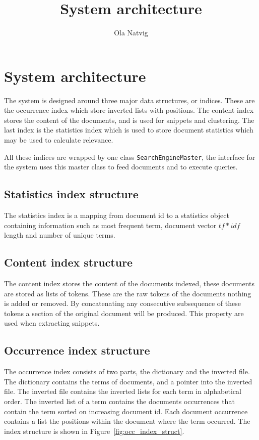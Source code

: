 \documentclass[]{article}
\title{System architecture}
\author{Ola Natvig}
\begin{document}
\maketitle
\section{System architecture}
The system is designed around three major data structures, or indices. These are the occurrence index which store inverted lists with positions. The content index stores the content of the documents, and is used for snippets and clustering. The last index is the statistics index which is used to store document statistics which may be used to calculate relevance. 

All these indices are wrapped by one class \texttt{SearchEngineMaster}, the interface for the system uses this master class to feed documents and to execute queries.  

\subsection{Statistics index structure}\label{sub:statistics_index_structure}
The statistics index is a mapping from document id to a statistics object containing information such as most frequent term, document vector $tf*idf$ length and number of unique terms.

\subsection{Content index structure}\label{sub:content_index_structure}
The content index stores the content of the documents indexed, these documents are stored as lists of tokens. These are the raw tokens of the documents nothing is added or removed. By concatenating any consecutive subsequence of these tokens a section of the original document will be produced. This property are used when extracting snippets.  

\subsection{Occurrence index structure}\label{sub:occurrence_index_structure}
The occurrence index consists of two parts, the dictionary and the inverted file. The dictionary contains the terms of documents, and a pointer into the inverted file. The inverted file contains the inverted lists for each term in alphabetical order. The inverted list of a term contains the documents occurrences that contain the term sorted on increasing document id. Each document occurrence contains a list the positions within the document where the term occurred. The index structure is shown in Figure~\ref{fig:occ_index_struct}.
\end{document}
